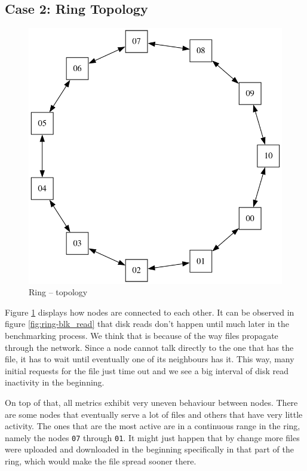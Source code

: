 \newpage
\subsection{Case 2: Ring Topology}

\begin{figure}
\centering
\captionsetup{justification=centering,width=0.6\linewidth}
\includegraphics[width=0.8\linewidth]{figures/topologies/ring.png}
\caption{Ring -- topology}
\label{fig:ring-topology}

\end{figure}
Figure \ref{fig:ring-topology} displays how nodes are connected to each other.
It can be observed in figure \ref{fig:ring-blk_read} that disk reads don't
happen until much later in the benchmarking process. We think that is because
of the way files propagate through the network. Since a node cannot talk
directly to the one that has the file, it has to wait until eventually one of
its neighbours has it. This way, many initial requests for the file just time
out and we see a big interval of disk read inactivity in the beginning.

On top of that, all metrics exhibit very uneven behaviour between nodes. There
are some nodes that eventually serve a lot of files and others that have very
little activity. The ones that are the most active are in a continuous range in
the ring, namely the nodes \verb|07| through \verb|01|. It might just happen
that by change more files were uploaded and downloaded in the beginning
specifically in that part of the ring, which would make the file spread sooner
there.

